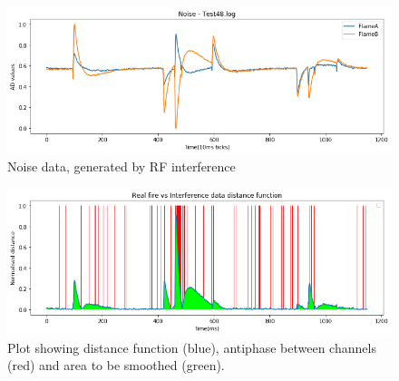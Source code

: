 \begin{figure}[tb]
 \centering %
 \includegraphics[width=\columnwidth]{pictures/04-noise.png}
 \caption{Noise data, generated by RF interference}
 \label{fig:sample}
\end{figure}

\begin{figure}[tb]
 \centering %
 \includegraphics[width=\columnwidth]{pictures/02-area-to-filter.png}
 \caption{Plot showing distance function (blue), antiphase between channels (red) and area to be smoothed (green).}
 \label{fig:sample}
\end{figure}